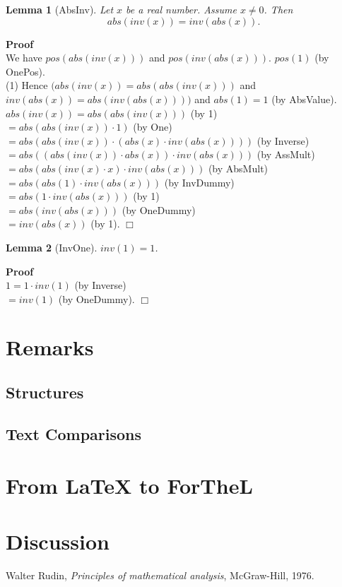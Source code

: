\documentclass{article}
\newenvironment{forthel}{\begin{leftbar}}{\end{leftbar}}
\newenvironment{proof}{\noindent\textbf{Proof\ }}{\hspace*{\fill}$\Box$\medskip}
\newtheorem{lemma}{Lemma}
\newcommand{\dotequal}{=}
\begin{document}
\begin{forthel}
	
	
	\begin{lemma}[AbsInv]
	Let $x$ be a real number. Assume $x \neq 0$. Then $$abs(inv(x)) = inv(abs(x)).$$
	\end{lemma}
	\begin{proof} \\
	We have $pos(abs(inv(x)))$ and $pos(inv(abs(x)))$.
	$pos(1)$ (by OnePos).
	\\(1) Hence $( abs(inv(x)) = abs(abs(inv(x)))$ and $inv(abs(x)) = abs(inv(abs(x))) )$ and $abs(1) = 1$ (by AbsValue).
	\\$abs(inv(x)) \dotequal abs(abs(inv(x)))$ (by 1)
	\\$\dotequal abs(abs(inv(x)) \cdot 1)$ (by One)
	\\$\dotequal abs(abs(inv(x)) \cdot (abs(x) \cdot inv(abs(x))))$ (by Inverse)
	\\$\dotequal abs((abs(inv(x)) \cdot abs(x)) \cdot inv(abs(x)))$ (by AssMult)
	\\$\dotequal abs(abs(inv(x) \cdot x) \cdot inv(abs(x)))$ (by AbsMult)
	\\$\dotequal abs(abs(1) \cdot inv(abs(x)))$ (by InvDummy)
	\\$\dotequal abs(1 \cdot inv(abs(x)))$ (by 1) 
	\\$\dotequal abs(inv(abs(x)))$ (by OneDummy)
	\\$\dotequal inv(abs(x))$ (by 1).    
	\end{proof}
	
	
	\begin{lemma}[InvOne]
	$inv(1) = 1$.
	\end{lemma}
	\begin{proof}\\
	$1 \dotequal 1 \cdot inv(1)$ (by Inverse)
	\\$\dotequal inv(1)$ (by OneDummy).
	\end{proof}   
	
\end{forthel}


\section{Remarks}
\subsection{Structures}


\subsection{Text Comparisons}



\section{{From \LaTeX} to ForTheL}



\section{Discussion}


\begin{thebibliography}{1}

  Walter Rudin,
  \textit{Principles of mathematical analysis},
  McGraw-Hill,
  1976.

\end{thebibliography}
  
\end{document}

